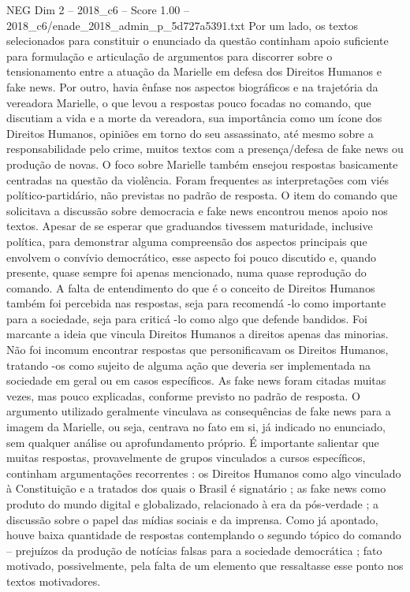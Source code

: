 \begin{textsample}{NEG Dim 2 – 2018\_c6 – Score 1.00 – 2018\_c6/enade\_2018\_admin\_p\_5d727a5391.txt}
Por um lado, os textos selecionados para constituir o enunciado da questão continham apoio suficiente para formulação e articulação de argumentos para discorrer sobre o tensionamento entre a atuação da Marielle em defesa dos Direitos Humanos e fake news.
Por outro, havia ênfase nos aspectos biográficos e na trajetória da vereadora Marielle, o que levou a respostas pouco focadas no comando, que discutiam a vida e a morte da vereadora, sua importância como um ícone dos Direitos Humanos, opiniões em torno do seu assassinato, até mesmo sobre a responsabilidade pelo crime, muitos textos com a presença/defesa de fake news ou produção de novas.
O foco sobre Marielle também ensejou respostas basicamente centradas na questão da violência.
Foram frequentes as interpretações com viés político-partidário, não previstas no padrão de resposta.
O item do comando que solicitava a discussão sobre democracia e fake news encontrou menos apoio nos textos.
Apesar de se esperar que graduandos tivessem maturidade, inclusive política, para demonstrar alguma compreensão dos aspectos principais que envolvem o convívio democrático, esse aspecto foi pouco discutido e, quando presente, quase sempre foi apenas mencionado, numa quase reprodução do comando.
A falta de entendimento do que é o conceito de Direitos Humanos também foi percebida nas respostas, seja para recomendá -lo como importante para a sociedade, seja para criticá -lo como algo que defende bandidos.
Foi marcante a ideia que vincula Direitos Humanos a direitos apenas das minorias.
Não foi incomum encontrar respostas que personificavam os Direitos Humanos, tratando -os como sujeito de alguma ação que deveria ser implementada na sociedade em geral ou em casos específicos.
As fake news foram citadas muitas vezes, mas pouco explicadas, conforme previsto no padrão de resposta.
O argumento utilizado geralmente vinculava as consequências de fake news para a imagem da Marielle, ou seja, centrava no fato em si, já indicado no enunciado, sem qualquer análise ou aprofundamento próprio.
É importante salientar que muitas respostas, provavelmente de grupos vinculados a cursos específicos, continham argumentações recorrentes : os Direitos Humanos como algo vinculado à Constituição e a tratados dos quais o Brasil é signatário ; as fake news como produto do mundo digital e globalizado, relacionado à era da pós-verdade ; a discussão sobre o papel das mídias sociais e da imprensa.
Como já apontado, houve baixa quantidade de respostas contemplando o segundo tópico do comando – prejuízos da produção de notícias falsas para a sociedade democrática ; fato motivado, possivelmente, pela falta de um elemento que ressaltasse esse ponto nos textos motivadores.

\end{textsample}
